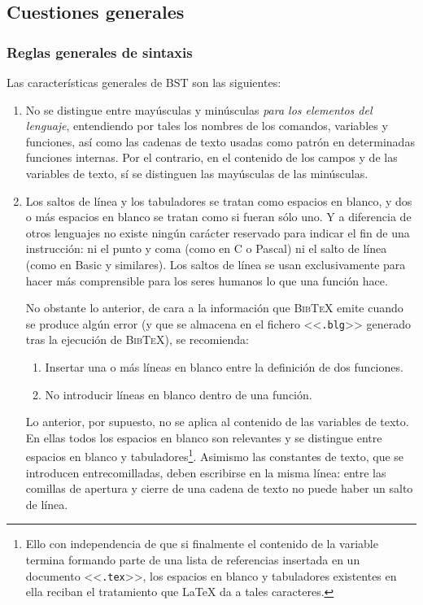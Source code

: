 \documentclass[a4paper,11pt]{article}
\def\btx-{\textsc{Bib\TeX}}
\def\ltx-{\LaTeX}
\def\ltr#1-{<<\texttt{#1}>>}
\def\tpf#1-{\ltr.#1-}
\begin{document}
\subsection{Cuestiones generales}
\label{sec:cuestiones-generales}

\subsubsection{Reglas generales de sintaxis}
\label{sec:reglas-generales-de}

Las características generales de BST son las siguientes:

\begin{enumerate}

\item No se  distingue entre mayúsculas y minúsculas  \emph{para los elementos
    del  lenguaje},  entendiendo  por  tales  los  nombres  de  los  comandos,
  variables y funciones,  así como las cadenas de texto  usadas como patrón en
  determinadas funciones  internas. Por el  contrario, en el contenido  de los
  campos y de  las variables de texto, sí se distinguen  las mayúsculas de las
  minúsculas.

\item Los saltos de línea y los tabuladores se tratan como espacios en blanco,
  y dos  o más  espacios en blanco  se tratan  como si fueran  sólo uno.   Y a
  diferencia  de otros  lenguajes  no existe  ningún  carácter reservado  para
  indicar el fin de  una instrucción: ni el punto y coma  (como en C o Pascal)
  ni el  salto de línea (como  en Basic y  similares). Los saltos de  línea se
  usan exclusivamente  para hacer más  comprensible para los seres  humanos lo
  que una función hace.

  No obstante lo anterior, de cara  a la información que \btx- emite cuando se
  produce algún error (y que se almacena en el fichero \tpf blg- generado tras
  la ejecución de \btx-), se recomienda:

  \begin{enumerate}

  \item  Insertar una  o  más líneas  en  blanco entre  la  definición de  dos
    funciones.

  \item No introducir líneas en blanco dentro de una función.

  \end{enumerate}

  Lo anterior,  por supuesto, no  se aplica al  contenido de las  variables de
  texto. En ellas  todos los espacios en blanco son  relevantes y se distingue
  entre espacios  en blanco  y tabuladores\footnote{Ello con  independencia de
    que si  finalmente el contenido de  la variable termina  formando parte de
    una lista de referencias insertada en un documento \tpf tex-, los espacios
    en  blanco y  tabuladores existentes  en ella  reciban el  tratamiento que
    \ltx- da  a tales caracteres.}. Asimismo  las constantes de  texto, que se
  introducen entrecomilladas,  deben escribirse en  la misma línea:  entre las
  comillas de apertura y cierre de una cadena de texto no puede haber un salto
  de línea.


\end{enumerate}
\end{document}
